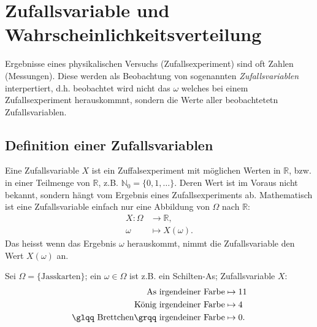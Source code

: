 \chapter{Zufallsvariable und Wahrscheinlichkeitsverteilung}
\label{kap2}
Ergebnisse eines physikalischen Versuchs (Zufallsexperiment) sind oft Zahlen (Messungen). Diese werden als Beobachtung von sogenannten \emph{Zufallsvariablen} interpertiert, d.h. beobachtet wird nicht das $\omega$ welches bei einem Zufallsexperiment herauskommnt, sondern die Werte aller beobachtetetn Zufallsvariablen.
\section{Definition einer Zufallsvariablen}
Eine Zufallsvariable $X$ ist ein Zuffalsexperiment mit möglichen Werten in $\mathbb{R}$, bzw. in einer Teilmenge von $\mathbb{R}$, z.B. $\mathbb{N}_0=\{0,1,\ldots\}$. Deren Wert ist im Voraus nicht bekannt, sondern hängt vom Ergebnis eines Zufallsexperiments ab. Mathematisch ist eine Zufallsvariable einfach nur eine Abbildung von $\Omega$ nach $\mathbb{R}$:
\begin{align*}
	X:\Omega&\to \mathbb{R},\\
	\omega &\mapsto X(\omega).
\end{align*}
Das heisst wenn das Ergebnis $\omega$ herauskommt, nimmt die Zufallsvariable den Wert $X(\omega)$ an.
\begin{bspl}
	Sei $\Omega=\{\text{Jasskarten}\}$; ein $\omega\in\Omega$ ist z.B. ein Schilten-As; Zufallsvariable $X$:
	\begin{align*}
		\text{As irgendeiner Farbe}&\mapsto 11\\
		\text{König irgendeiner Farbe}&\mapsto 4\\
		\text{\glqq Brettchen\grqq\ irgendeiner Farbe}&\mapsto 0.
	\end{align*}
\end{bspl}
